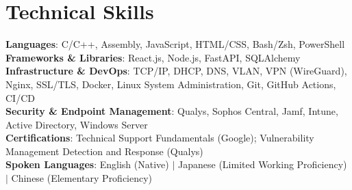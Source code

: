 \documentclass[letterpaper,11pt]{article}
\begin{document}
\section{Technical Skills}
 \begin{itemize}[leftmargin=0.15in, label={}]
    \small{\item{
     \textbf{Languages}{: C/C++, Assembly, JavaScript, HTML/CSS, Bash/Zsh, PowerShell} \\
     \textbf{Frameworks \& Libraries}{: React.js, Node.js, FastAPI, SQLAlchemy} \\
     \textbf{Infrastructure \& DevOps}{: TCP/IP, DHCP, DNS, VLAN, VPN (WireGuard), Nginx, SSL/TLS, Docker, Linux System Administration, Git, GitHub Actions, CI/CD} \\
     \textbf{Security \& Endpoint Management}{: Qualys, Sophos Central, Jamf, Intune, Active Directory, Windows Server} \\
     \textbf{Certifications}{: Technical Support Fundamentals (Google); Vulnerability Management Detection and Response (Qualys)} \\
     \textbf{Spoken Languages}{: English (Native) $|$ Japanese (Limited Working Proficiency) $|$ Chinese (Elementary Proficiency)} \\
    }}
 \end{itemize}

\end{document}
